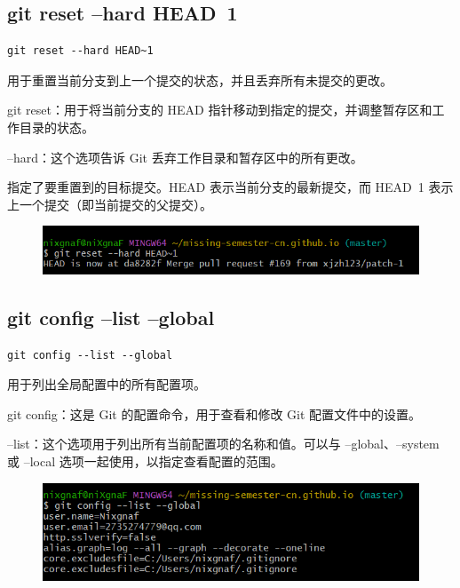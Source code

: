 \documentclass{article}
\begin{document}
\subsection{git reset --hard HEAD~1}
\begin{lstlisting}
git reset --hard HEAD~1
\end{lstlisting}

\noindent 用于重置当前分支到上一个提交的状态，并且丢弃所有未提交的更改。

\noindent git reset：用于将当前分支的 HEAD 指针移动到指定的提交，并调整暂存区和工作目录的状态。

\noindent --hard：这个选项告诉 Git 丢弃工作目录和暂存区中的所有更改。

\noindent 指定了要重置到的目标提交。HEAD 表示当前分支的最新提交，而 HEAD~1 表示上一个提交（即当前提交的父提交）。

\begin{figure}[h]
    \centering
    \includegraphics[width=1\linewidth]{picture/gitreset.png}
\end{figure}

\subsection{git config --list --global}
\begin{lstlisting}
git config --list --global
\end{lstlisting}

\noindent 用于列出全局配置中的所有配置项。

\noindent git config：这是 Git 的配置命令，用于查看和修改 Git 配置文件中的设置。

\noindent --list：这个选项用于列出所有当前配置项的名称和值。可以与 --global、--system 或 --local 选项一起使用，以指定查看配置的范围。
\begin{figure}[h]
    \centering
    \includegraphics[width=1\linewidth]{picture/gitconfiglist.png}
\end{figure}
\end{document}
